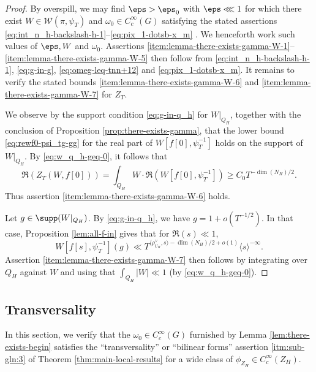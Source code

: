\begin{proof}
  By overspill, we may find $\eps > \eps_0$ with $\eps \lll 1$ for which there exist $W \in \mathcal{W}(\pi,\psi_T)$ and $\omega_0 \in C_c^\infty(G)$ satisfying the stated assertions \eqref{eq:int_n_h-backslash-h-1}--\eqref{eq:pix_1-dotsb-x_m} .  We henceforth work such values of $\eps, W$ and $\omega_0$.  Assertions \eqref{item:lemma-there-exists-gamma-W-1}--\eqref{item:lemma-there-exists-gamma-W-5} then follow from \eqref{eq:int_n_h-backslash-h-1}, \eqref{eq:g-in-g}, \eqref{eq:omeg-leq-tnn+12} and \eqref{eq:pix_1-dotsb-x_m}.  It remains to verify the stated bounds \eqref{item:lemma-there-exists-gamma-W-6} and \eqref{item:lemma-there-exists-gamma-W-7} for $Z_T$.

  We observe by the support condition \eqref{eq:g-in-q_h} for $W|_{Q_H}$, together with the conclusion of Proposition \ref{prop:there-exists-gamma}, that the lower bound \eqref{eq:rewf0-psi_tg-gg} for the real part of $W[f[0],\psi_T^{-1}]$ holds on the support of $W|_{Q_H}$.  By \eqref{eq:w_q_h-geq-0}, it follows that
  \begin{equation*}
    \Re(Z_T(W,f[0]))
    =
    \int_{Q_H}
    W \cdot \Re(W[f[0],\psi_T^{-1}])
    \geq C_0 T^{-\dim(N_H) / 2}.
  \end{equation*}
  Thus assertion \eqref{item:lemma-there-exists-gamma-W-6} holds.

  Let $g \in \supp(W|_{Q_H})$.  By \eqref{eq:g-in-q_h}, we have $g = 1 + o(T^{-1/2})$.  In that case, Proposition \ref{lem:all-f-in} gives that for $\Re(s) \ll 1$,
  \begin{equation}
    W[f[s], \psi_T^{-1}](g) \ll T^{\langle \rho_{U_H}^\vee, s \rangle - \dim(N_H)/2 + o(1)} \langle s \rangle^{-\infty }.
  \end{equation}
  Assertion \eqref{item:lemma-there-exists-gamma-W-7} then follows by integrating over $Q_H$ against $W$ and using that $\int_{Q_H} \lvert W \rvert \ll 1$ (by \eqref{eq:w_q_h-geq-0}).
\end{proof}




\subsection{Transversality}\label{sec:cnpv1hjjro}
In this section, we verify that the $\omega_0 \in C_c^\infty(G)$ furnished by Lemma \ref{lem:there-exists-begin} satisfies the ``transversality'' or ``bilinear forms'' assertion \eqref{itm:sub-gln:3} of Theorem \ref{thm:main-local-results} for a wide class of $\phi_{Z_H} \in C_c^\infty(Z_H)$.


